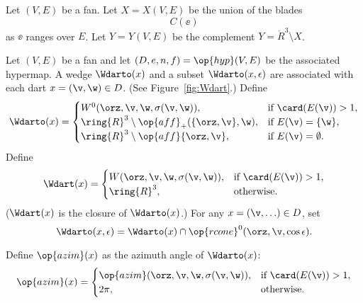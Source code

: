 \begin{definition}[X,~Y]\label{def:XY}
Let $(V,E)$ be a fan.  Let $X=X(V,E)$ be the union of the
blades
\[ C(\ee)\] 
as $\ee$ ranges over $E$.  Let $Y=Y(V,E)$ be the complement
$Y = \ring{R}^3\setminus X$.
%
%
\end{definition}

\begin{definition}[$\Wdarto$,~$\Wdart$]
Let $(V,E)$ be a fan and let $(D,e,n,f) = \op{hyp}(V,E)$
be the associated hypermap.  
A wedge $\Wdarto(x)$ and a subset $\Wdarto(x,\epsilon)$ are associated with
 each dart $x=(\v,\w)\in D$.  (See Figure~\ref{fig:Wdart}.)  Define 
%
%
%
%
%
%
%
%
%
\[ 
\Wdarto(x)=
\begin{cases} 
W^0(\orz,\v,\w,\sigma(\v,\w)),&\text{if }\card(E(\v))>1,\\
\ring{R}^3\setminus \op{aff}_+(\{\orz,\v\},\w),&\text{if } E(\v) = \{\w\},\\
\ring{R}^3\setminus \op{aff}\{\orz,\v\},&\text{if } E(\v) = \emptyset.\\
\end{cases}
\] 
Define
\[ 
\Wdart(x) = 
\begin{cases} 
W(\orz,\v,\w,\sigma(\v,\w)),&\text{if }\card(E(\v))>1,\\
\ring{R}^3,&\text{otherwise}.\\
\end{cases}
\] 
($\Wdart(x)$ is the closure of $\Wdarto(x)$.)
For any $x = (\v,\ldots)\in D$, set
\[ 
\Wdarto(x,\epsilon) = \Wdarto(x) \cap \op{rcone}^0(\orz,\v,\cos\epsilon).
\] 
%
\end{definition}

\figSCDMRGM %

\begin{definition}[$\op{azim}$]
Define $\op{azim}(x)$ as the azimuth angle of $\Wdarto(x)$:
%
\[ 
\op{azim}(x)=\begin{cases}
\op{azim}(\orz,\v,\w,\sigma(\v,\w)), &\text{if } \card(E(\v)) > 1,\\
2\pi, & \text{otherwise.}\\
\end{cases}
\] 
\end{definition}

